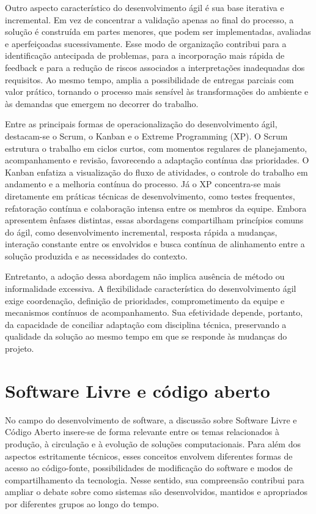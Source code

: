 \documentclass[grad,pdftex]{poli}
\begin{document}
Outro aspecto característico do desenvolvimento ágil é sua base iterativa e incremental. Em vez de concentrar a validação apenas ao final do processo, a solução é construída em partes menores, que podem ser implementadas, avaliadas e aperfeiçoadas sucessivamente. Esse modo de organização contribui para a identificação antecipada de problemas, para a incorporação mais rápida de feedback e para a redução de riscos associados a interpretações inadequadas dos requisitos. Ao mesmo tempo, amplia a possibilidade de entregas parciais com valor prático, tornando o processo mais sensível às transformações do ambiente e às demandas que emergem no decorrer do trabalho.

Entre as principais formas de operacionalização do desenvolvimento ágil, destacam-se o Scrum, o Kanban e o Extreme Programming (XP). O Scrum estrutura o trabalho em ciclos curtos, com momentos regulares de planejamento, acompanhamento e revisão, favorecendo a adaptação contínua das prioridades. O Kanban enfatiza a visualização do fluxo de atividades, o controle do trabalho em andamento e a melhoria contínua do processo. Já o XP concentra-se mais diretamente em práticas técnicas de desenvolvimento, como testes frequentes, refatoração contínua e colaboração intensa entre os membros da equipe. Embora apresentem ênfases distintas, essas abordagens compartilham princípios comuns do ágil, como desenvolvimento incremental, resposta rápida a mudanças, interação constante entre os envolvidos e busca contínua de alinhamento entre a solução produzida e as necessidades do contexto.

Entretanto, a adoção dessa abordagem não implica ausência de método ou informalidade excessiva. A flexibilidade característica do desenvolvimento ágil exige coordenação, definição de prioridades, comprometimento da equipe e mecanismos contínuos de acompanhamento. Sua efetividade depende, portanto, da capacidade de conciliar adaptação com disciplina técnica, preservando a qualidade da solução ao mesmo tempo em que se responde às mudanças do projeto.

\section{Software Livre e código aberto}

No campo do desenvolvimento de software, a discussão sobre Software Livre e Código Aberto insere-se de forma relevante entre os temas relacionados à produção, à circulação e à evolução de soluções computacionais. Para além dos aspectos estritamente técnicos, esses conceitos envolvem diferentes formas de acesso ao código-fonte, possibilidades de modificação do software e modos de compartilhamento da tecnologia. Nesse sentido, sua compreensão contribui para ampliar o debate sobre como sistemas são desenvolvidos, mantidos e apropriados por diferentes grupos ao longo do tempo.
\end{document}
